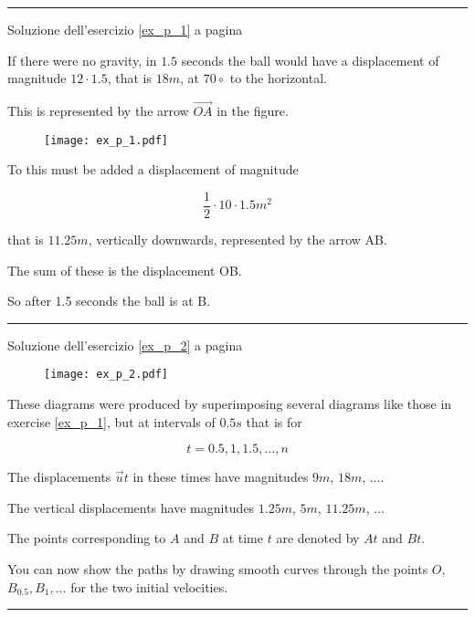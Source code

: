 

\vspace{1cm}
\hrule
\vspace{1cm}

Soluzione dell'esercizio \ref{ex_p_1} a pagina \pageref{ex_p_1}\label{sol_p_1}

If there were no gravity, in $1.5$ seconds the ball would have a displacement of
magnitude $12 \cdot 1.5$, that is $18 m$, at $70\circ$ to the horizontal.

This is represented by the arrow $\overrightarrow{OA}$ in the figure.

\begin{figure}[H]
\centering
\texttt{[image: ex\_p\_1.pdf]}
\end{figure}

To this must be added a displacement of magnitude 

\begin{equation*}
\frac{1}{2}\cdot 10 \cdot 1.5m^2
\end{equation*}

that is $11.25 m$, vertically downwards, represented by the arrow AB.

The sum of these is the displacement OB.

So after 1.5 seconds the ball is at B.

\vspace{1cm}
\hrule
\vspace{1cm}

\begin{minipage}{\textwidth}
Soluzione dell'esercizio \ref{ex_p_2} a pagina \pageref{ex_p_2}\label{sol_p_2}

\begin{figure}[H]
\centering
\texttt{[image: ex\_p\_2.pdf]}
\end{figure}

These diagrams were produced by superimposing several diagrams like
those in exercise \ref{ex_p_1}, but at intervals of $0.5s$ that is for

\begin{equation*}
t=0.5,1,1.5,\ldots,n
\end{equation*}


The displacements $\vec{u}t$ in these times have magnitudes $9 m$, $18 m$, $\ldots$.

The vertical displacements have magnitudes $1.25 m$, $5 m$, $11.25 m$, $\ldots$

The points corresponding to $A$ and $B$ at time $t$ are denoted by $At$ and $Bt$.

You can now show the paths by drawing smooth curves through the points $O$,
$B_{0.5}, B_{1}, \ldots$
for the two initial velocities.

\end{minipage}
\vspace{1cm}
\hrule
\vspace{1cm}

